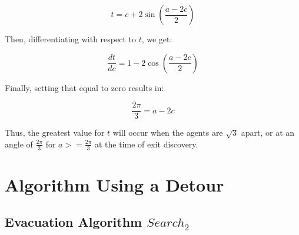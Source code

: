 \documentclass[11pt]{article}
\begin{document}
\begin{flushleft}
\[ t = c + 2 \sin (\frac{a - 2c}{2}) \]

\vspace*{5mm} Then, differentiating with respect to $t$, we get:

\[ \frac{dt}{dc} = 1 - 2 \cos (\frac{a - 2c}{2}) \]

\vspace*{5mm} Finally, setting that equal to zero results in:

\[ \frac{2\pi}{3} = a - 2c \]

\vspace*{5mm} Thus, the greatest value for $t$ will occur when the agents are $\sqrt{3}$ apart,
or at an angle of $ \frac{2\pi}{3}$ for $a >= \frac{2\pi}{3}$ at the time of exit discovery.

\vfill

\end{flushleft}

\section{Algorithm Using a Detour}

\subsection{Evacuation Algorithm $Search_{2}$}
\end{document}

